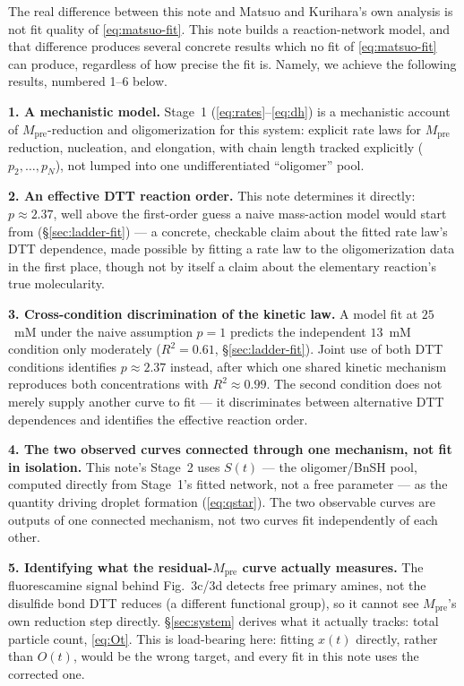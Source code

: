 \documentclass[11pt]{article}
\begin{document}
The real difference between this note and Matsuo and Kurihara's own analysis is not fit
quality of \eqref{eq:matsuo-fit}. This note builds a reaction-network model, and that
difference produces several concrete results which no fit of \eqref{eq:matsuo-fit} can
produce, regardless of how precise the fit is. Namely, we achieve the following results,
numbered 1--6 below.

\textbf{1. A mechanistic model.} Stage~1
(\eqref{eq:rates}--\eqref{eq:dh}) is a mechanistic
account of $M_{\mathrm{pre}}$-reduction and oligomerization for this system: explicit rate laws
for $M_{\mathrm{pre}}$ reduction, nucleation, and elongation, with chain length tracked
explicitly ($p_2,\ldots,p_N$), not lumped into one undifferentiated ``oligomer'' pool.

\textbf{2. An effective DTT reaction order.} This note determines it
directly: $p\approx2.37$, well above the first-order guess a naive mass-action
model would start from (\S\ref{sec:ladder-fit}) --- a concrete, checkable claim about the
fitted rate law's DTT dependence, made possible by fitting a rate law to the oligomerization
data in the first place, though not by itself a claim about the elementary reaction's true
molecularity.

\textbf{3. Cross-condition discrimination of the kinetic law.}
A model fit at $25$~mM under the naive assumption $p=1$ predicts the independent $13$~mM
condition only moderately ($R^2=0.61$, \S\ref{sec:ladder-fit}). Joint use of both DTT
conditions identifies $p\approx2.37$ instead, after which one shared kinetic mechanism
reproduces both concentrations with $R^2\approx0.99$. The second condition does not merely
supply another curve to fit --- it discriminates between alternative DTT dependences and
identifies the effective reaction order.

\textbf{4. The two observed curves connected through one mechanism, not fit in isolation.}
This note's Stage~2 uses $S(t)$ --- the oligomer/BnSH pool, computed directly from Stage~1's
fitted network, not a free parameter --- as the quantity driving droplet formation
(\eqref{eq:qstar}). The two observable curves are outputs of one connected mechanism, not two
curves fit independently of each other.

\textbf{5. Identifying what the residual-$M_{\mathrm{pre}}$ curve actually measures.} The
fluorescamine signal behind Fig.~3c/3d detects free primary amines, not the disulfide bond DTT
reduces (a different functional group), so it cannot see $M_{\mathrm{pre}}$'s own reduction
step directly. \S\ref{sec:system} derives what it actually tracks: total particle count,
\eqref{eq:Ot}. This is load-bearing here: fitting $x(t)$ directly, rather than $O(t)$, would be
the wrong target, and every fit in this note uses the corrected one.
\end{document}
